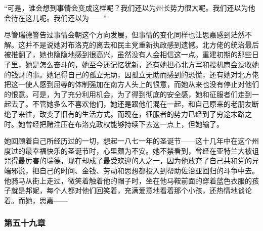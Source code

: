 \par “可是，谁会想到事情会变成这样呢？我们还以为州长势力很大呢。我们还以为他会待在这儿呢。我们还以为——”
\par 尽管瑞德警告过事情会朝这个方向发展，但事情的变化同样也让思嘉感到茫然不解。这并不是说她对布洛克的离去和民主党重新执政感到遗憾。北方佬的统治最后被推翻了，她也隐隐地感到很高兴，虽然没有人会相信这一点。重建初期的那些日子里，她是怎么奋斗的，她至今还记忆犹新，还有她担心北方军和投机商会没收她的钱财的事。她记得自己的孤立无助，因孤立无助而感到的恐慌，还有她对北方佬把这一使人感到屈辱的体制强加在南方人头上的恨意，而她从来也没有停止对他们的恨意。可是，为了充分利用机会，为了得到彻底的安全感，她和征服者们走到一起去了。不管她多么不喜欢他们，她还是跟他们混在一起，和自己原来的老朋友断绝了来往，改变了旧有的生活方式。而现在，征服者的势力已经到了穷途末路之时。她曾经把赌注压在布洛克政权能够持续下去这一点上，但她输了。
\par 她回顾着自己所经历过的一切，想起一八七一年的圣诞节——这十几年中在这个州度过的最幸福快乐的圣诞节时，心里颇为不安。她不禁看到，曾经在亚特兰大被诅咒得最厉害的瑞德，现在却成了最受欢迎的人之一，因为他放弃了自己共和党的异端邪说，把自己的时间、金钱、劳动和思想都投入到帮助佐治亚回归的斗争中去。他骑马从街上走过，微笑着触着他的帽子时，坐在他马鞍前面的穿着蓝色衣服的孩子就是邦妮，每个人都对他们回笑着，充满爱意地看着那个小孩，还热情地谈论着。而她，思嘉——

\subsubsection{第五十九章}

